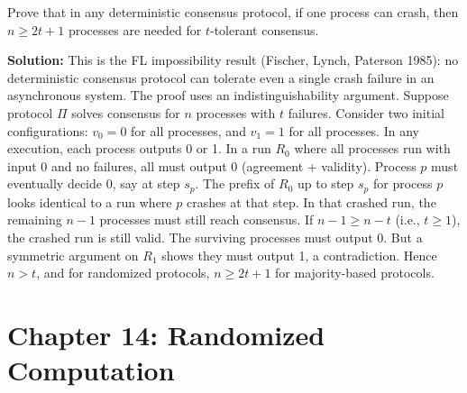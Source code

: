 \begin{exercise}[Challenge]
Prove that in any deterministic consensus protocol, if one process can crash, then $n \ge 2t + 1$ processes are needed for $t$-tolerant consensus.
\end{exercise}
\textbf{Solution:} This is the FL impossibility result (Fischer, Lynch, Paterson 1985): no deterministic consensus protocol can tolerate even a single crash failure in an asynchronous system. The proof uses an indistinguishability argument. Suppose protocol $\Pi$ solves consensus for $n$ processes with $t$ failures. Consider two initial configurations: $v_0 = 0$ for all processes, and $v_1 = 1$ for all processes. In any execution, each process outputs 0 or 1. In a run $R_0$ where all processes run with input 0 and no failures, all must output 0 (agreement + validity). Process $p$ must eventually decide 0, say at step $s_p$. The prefix of $R_0$ up to step $s_p$ for process $p$ looks identical to a run where $p$ crashes at that step. In that crashed run, the remaining $n-1$ processes must still reach consensus. If $n-1 \ge n-t$ (i.e., $t \ge 1$), the crashed run is still valid. The surviving processes must output 0. But a symmetric argument on $R_1$ shows they must output 1, a contradiction. Hence $n > t$, and for randomized protocols, $n \ge 2t + 1$ for majority-based protocols.

\section{Chapter 14: Randomized Computation}

